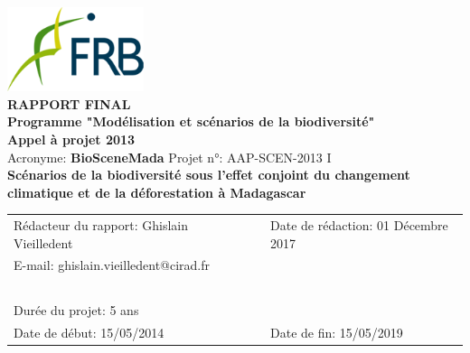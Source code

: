 \begin{center}
\includegraphics[width=4cm]{figures/FRB.png}\\
\vspace{1cm}
{\large
  \textbf{
    RAPPORT FINAL\\
    Programme "Modélisation et scénarios de la biodiversité"\\
    Appel à projet 2013\\
  }
}
\vspace{1cm}
Acronyme: \textbf{BioSceneMada} \hspace{2cm} Projet n°: AAP-SCEN-2013 I\\
\vspace{1cm}
{\Large \textbf{Scénarios de la biodiversité sous l'effet conjoint du changement climatique et de la déforestation à Madagascar}}\\
\vspace{1cm}
\begin{tabular}{lcl}
Rédacteur du rapport: Ghislain Vieilledent & \hspace{1cm} & Date de rédaction: 01 Décembre 2017\\
E-mail: ghislain.vieilledent@cirad.fr & \hspace{1cm} & ~ \\ 
~ & ~ \\
Durée du projet: 5 ans & \hspace{1cm} & ~ \\
Date de début: 15/05/2014 & \hspace{1cm} & Date de fin: 15/05/2019\\
\end{tabular}
\end{center}
\newpage